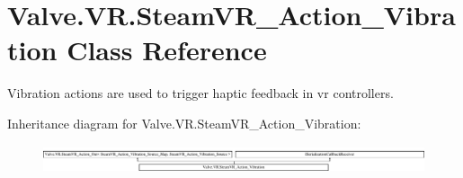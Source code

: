 \hypertarget{class_valve_1_1_v_r_1_1_steam_v_r___action___vibration}{}\section{Valve.\+V\+R.\+Steam\+V\+R\+\_\+\+Action\+\_\+\+Vibration Class Reference}
\label{class_valve_1_1_v_r_1_1_steam_v_r___action___vibration}


Vibration actions are used to trigger haptic feedback in vr controllers.  


Inheritance diagram for Valve.\+V\+R.\+Steam\+V\+R\+\_\+\+Action\+\_\+\+Vibration\+:\begin{figure}[H]
\begin{center}
\leavevmode
\includegraphics[height=0.843373cm]{class_valve_1_1_v_r_1_1_steam_v_r___action___vibration}
\end{center}
\end{figure}
